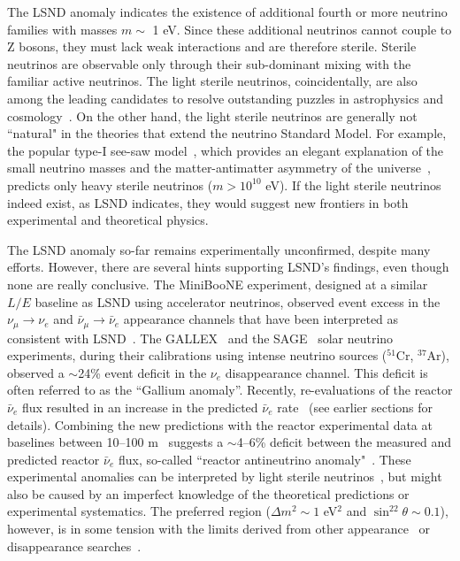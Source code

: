 \documentclass[aps,twocolumn,preprintnumbers,amsmath,superscriptaddress,amssymb,floats,nofootinbib]{revtex4-1}
\begin{document}
The LSND anomaly indicates the existence of additional fourth or more neutrino families with masses $m \sim$ 1 eV. 
Since these additional neutrinos cannot couple to Z bosons, they must lack weak interactions and are therefore sterile. 
Sterile neutrinos are observable only through their sub-dominant mixing with the familiar active neutrinos. 
The light sterile neutrinos, coincidentally, are also among the leading candidates to resolve outstanding puzzles in astrophysics and 
cosmology~\cite{Dodelson,Kusenko,Wyman,Battye}.
On the other hand, the light sterile neutrinos are generally not ``natural" in the theories that extend the neutrino Standard Model. 
For example, the popular type-I see-saw model~\cite{Minkowski,Yanagida,GellMann,Mohapatra}, 
which provides an elegant explanation of the small neutrino masses and the matter-antimatter asymmetry of the universe~\cite{Fukugita}, predicts only heavy sterile neutrinos ($m >10^{10}$ eV).
If the light sterile neutrinos indeed exist, as LSND indicates, they would suggest new frontiers in both experimental and theoretical physics.

The LSND anomaly so-far remains experimentally unconfirmed, despite many efforts. 
However, there are several hints supporting LSND's findings, even though none are really conclusive.
The MiniBooNE experiment, designed at a similar $L/E$ baseline as LSND using accelerator neutrinos, observed event excess 
in the $\nu_{\mu}\rightarrow\nu_e$ and $\bar\nu_{\mu}\rightarrow\bar\nu_e$ appearance channels that have been interpreted as consistent with LSND~\cite{MiniBooNE2007,MiniBooNE2013}.
The GALLEX~\cite{GALLEX2010} and the SAGE~\cite{SAGE2009} solar neutrino experiments, during their calibrations using intense neutrino sources ($^{51}$Cr, $^{37}$Ar), observed a $\sim$24\% event deficit in the $\nu_e$ disappearance channel. 
This deficit is often referred to as the ``Gallium anomaly''. 
Recently, re-evaluations of the reactor $\bar\nu_e$ flux resulted in an increase in the predicted $\bar\nu_e$ rate~\cite{Mueller, Huber} (see earlier sections for details).
Combining the new predictions with the reactor experimental data at baselines between 10--100 m~\cite{ILL,Gosgen,Rovno,Krasnoyarsk,SRP,Bugey4,Bugey3} suggests a $\sim$4--6\% deficit between the measured and predicted reactor $\bar\nu_e$ flux, so-called 
``reactor antineutrino anomaly"~\cite{Mention,Zhang13}. 
These experimental anomalies can be interpreted by light sterile neutrinos~\cite{Guinti2011}, 
but might also be caused by an imperfect knowledge of the theoretical predictions or experimental systematics.  
The preferred region ($\Delta{m}^2\sim1$ eV$^2$ and $\sin^22\theta\sim0.1$), however, is in some tension with the limits derived from other appearance~\cite{KARMEN2002,NOMAD03,OPERA13,ICARUS13} or disappearance searches~\cite{Stockdale84,Dydak84,MiniBooNE12-nubar,MiniBooNE12-nu,SuperK2000,MINOS11-NC,Bugey3,Conrad12,DayaBaySterile}.
\end{document}
